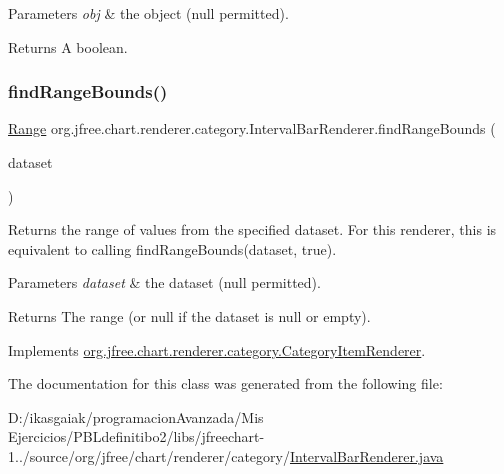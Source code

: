 \begin{DoxyParams}{Parameters}
{\em obj} & the object ({\ttfamily null} permitted).\\
\hline
\end{DoxyParams}
\begin{DoxyReturn}{Returns}
A boolean. 
\end{DoxyReturn}
\mbox{\label{classorg_1_1jfree_1_1chart_1_1renderer_1_1category_1_1_interval_bar_renderer_a5b0123164b3c4c4e88b0e844d0503ed8}} 
\subsubsection{\texorpdfstring{find\+Range\+Bounds()}{findRangeBounds()}}
{\footnotesize\ttfamily \mbox{\hyperlink{classorg_1_1jfree_1_1data_1_1_range}{Range}} org.\+jfree.\+chart.\+renderer.\+category.\+Interval\+Bar\+Renderer.\+find\+Range\+Bounds (\begin{DoxyParamCaption}\item[{\mbox{\hyperlink{interfaceorg_1_1jfree_1_1data_1_1category_1_1_category_dataset}{Category\+Dataset}}}]{dataset }\end{DoxyParamCaption})}

Returns the range of values from the specified dataset. For this renderer, this is equivalent to calling {\ttfamily find\+Range\+Bounds(dataset, true)}.


\begin{DoxyParams}{Parameters}
{\em dataset} & the dataset ({\ttfamily null} permitted).\\
\hline
\end{DoxyParams}
\begin{DoxyReturn}{Returns}
The range (or {\ttfamily null} if the dataset is {\ttfamily null} or empty). 
\end{DoxyReturn}


Implements \mbox{\hyperlink{interfaceorg_1_1jfree_1_1chart_1_1renderer_1_1category_1_1_category_item_renderer_aa7294c25a26ffd1725d7920a6041a785}{org.\+jfree.\+chart.\+renderer.\+category.\+Category\+Item\+Renderer}}.



The documentation for this class was generated from the following file\+:\begin{DoxyCompactItemize}
\item 
D\+:/ikasgaiak/programacion\+Avanzada/\+Mis Ejercicios/\+P\+B\+Ldefinitibo2/libs/jfreechart-\/1../source/org/jfree/chart/renderer/category/\mbox{\hyperlink{_interval_bar_renderer_8java}{Interval\+Bar\+Renderer.\+java}}\end{DoxyCompactItemize}
